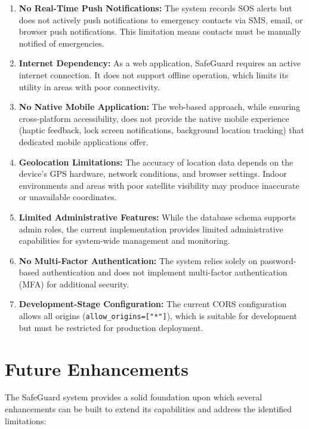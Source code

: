 \begin{enumerate}[label=\arabic*.]
  \item \textbf{No Real-Time Push Notifications:} The system records SOS alerts but does not actively push notifications to emergency contacts via SMS, email, or browser push notifications. This limitation means contacts must be manually notified of emergencies.

  \item \textbf{Internet Dependency:} As a web application, SafeGuard requires an active internet connection. It does not support offline operation, which limits its utility in areas with poor connectivity.

  \item \textbf{No Native Mobile Application:} The web-based approach, while ensuring cross-platform accessibility, does not provide the native mobile experience (haptic feedback, lock screen notifications, background location tracking) that dedicated mobile applications offer.

  \item \textbf{Geolocation Limitations:} The accuracy of location data depends on the device's GPS hardware, network conditions, and browser settings. Indoor environments and areas with poor satellite visibility may produce inaccurate or unavailable coordinates.

  \item \textbf{Limited Administrative Features:} While the database schema supports admin roles, the current implementation provides limited administrative capabilities for system-wide management and monitoring.

  \item \textbf{No Multi-Factor Authentication:} The system relies solely on password-based authentication and does not implement multi-factor authentication (MFA) for additional security.

  \item \textbf{Development-Stage Configuration:} The current CORS configuration allows all origins (\texttt{allow\_origins=["*"]}), which is suitable for development but must be restricted for production deployment.
\end{enumerate}

\section{Future Enhancements}

The SafeGuard system provides a solid foundation upon which several enhancements can be built to extend its capabilities and address the identified limitations:

